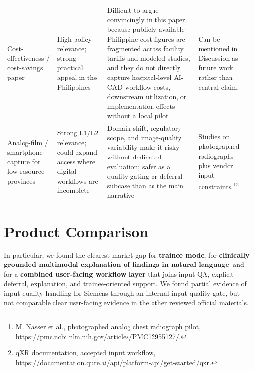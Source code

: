 \documentclass[11pt]{article}
\begin{document}
\begin{longtable}{p{} p{} p{} p{}}
Cost-effectiveness / cost-savings paper & High policy relevance; strong practical appeal in the Philippines & Difficult to argue convincingly in this paper because publicly available Philippine cost figures are fragmented across facility tariffs and modeled studies, and they do not directly capture hospital-level AI-CAD workflow costs, downstream utilization, or implementation effects without a local pilot & Can be mentioned in Discussion as future work rather than central claim. \\

Analog-film / smartphone capture for low-resource provinces & Strong L1/L2 relevance; could expand access where digital workflows are incomplete & Domain shift, regulatory scope, and image-quality variability make it risky without dedicated evaluation; safer as a quality-gating or deferral subcase than as the main narrative & Studies on photographed radiographs plus vendor input constraints.\footnote{M. Nasser et al., photographed analog chest radiograph pilot, \url{https://pmc.ncbi.nlm.nih.gov/articles/PMC12955127/}.}\footnote{qXR documentation, accepted input workflow, \url{https://documentation.qure.ai/api/platform-api/get-started/qxr}.} \\
\bottomrule
\end{longtable}

\section{Product Comparison}

In particular, we found the clearest market gap for \textbf{trainee mode}, for \textbf{clinically grounded multimodal explanation of findings in natural language}, and for a \textbf{combined user-facing workflow layer} that joins input QA, explicit deferral, explanation, and trainee-oriented support. We found partial evidence of input-quality handling for Siemens through an internal input quality gate, but not comparable clear user-facing evidence in the other reviewed official materials.
\end{document}
